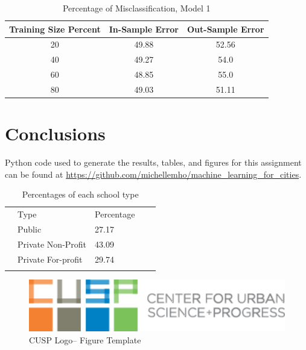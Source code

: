 \documentclass[10pt,twocolumn]{article}
\begin{document}
\begin{table}[ht]
\caption{Percentage of Misclassification, Model 1} %
\centering %
\begin{tabular}{c c c} %
\hline
Training Size Percent & In-Sample Error & Out-Sample Error \\ [0.5ex] %
\hline %
20 & 49.88 & 52.56 \\ %
40 & 49.27 & 54.0 \\
60 & 48.85 & 55.0 \\
80 & 49.03 & 51.11 \\ [1ex] %
\hline %
\end{tabular}
\label{table:model1}
\end{table}


\section{Conclusions}

Python code used to generate the results, tables, and figures for this assignment can be
found at \url{https://github.com/michellemho/machine_learning_for_cities}.

\begin{table}[h]
\centering
\caption{Percentages of each school type}
\label{my-label}
\begin{tabular}{lllll}
& Type                & Percentage &\\
& Public              & 27.17            & \\
& Private Non-Profit  & 43.09    & \\
& Private For-profit  & 29.74  & \\
                &                           &
\end{tabular}
\end{table}


\begin{figure}[!t]
  \begin{center}
    \includegraphics[width=6in]{cusp-index.png}
  \end{center}

  \caption{\small CUSP Logo-- Figure Template}
  \label{fig-1}
\end{figure}
\end{document}
